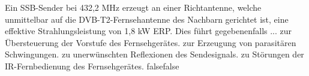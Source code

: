     {Ein SSB-Sender bei 432,2 MHz erzeugt an einer Richtantenne, welche unmittelbar auf die DVB-T2-Fernsehantenne des Nachbarn gerichtet ist, eine effektive Strahlungsleistung von 1,8 kW ERP. Dies führt gegebenenfalls ...}
    {zur Übersteuerung der Vorstufe des Fernsehgerätes.}
    {zur Erzeugung von parasitären Schwingungen.}
    {zu unerwünschten Reflexionen des Sendesignals.}
    {zu Störungen der IR-Fernbedienung des Fernsehgerätes.}
    {false}{false}